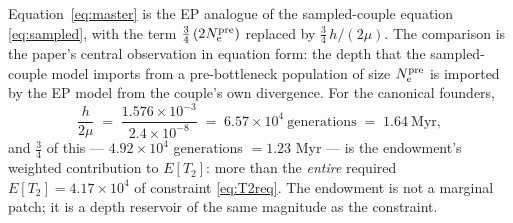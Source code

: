 Equation~\eqref{eq:master} is the EP analogue of the sampled-couple
equation \eqref{eq:sampled}, with the term $\tfrac34\,(2N_{\mathrm{e}}^{\mathrm{pre}})$ replaced by
$\tfrac34\,h/(2\mu)$. The comparison is the paper's central observation in
equation form: the depth that the sampled-couple model imports from a
pre-bottleneck population of size $N_{\mathrm{e}}^{\mathrm{pre}}$ is imported by the EP model from
the couple's own divergence. For the canonical founders,
\begin{equation}\label{eq:depth}
\frac{h}{2\mu} \;=\; \frac{1.576\times10^{-3}}{2.4\times10^{-8}}
\;=\; 6.57\times10^{4}\ \text{generations}
\;=\; 1.64\ \text{Myr},
\end{equation}
and $\tfrac34$ of this --- $4.92\times10^{4}$ generations $= 1.23$ Myr ---
is the endowment's weighted contribution to $E[T_2]$: more than the
\emph{entire} required $E[T_2] = 4.17\times10^{4}$ of constraint
\eqref{eq:T2req}. The endowment
is not a marginal patch; it is a depth reservoir of the same magnitude as
the constraint.

